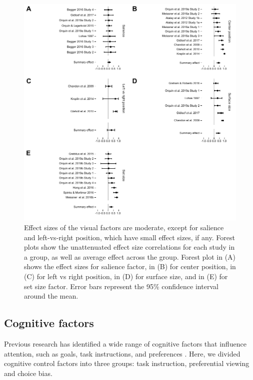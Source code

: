 \documentclass[english,natbib,man,floatsintext]{apa6}
\begin{document}
\begin{figure}[!h]
\includegraphics{forest_plots_visual}
\centering
\caption{Effect sizes of the visual factors are moderate, except for salience and left-vs-right position, which have small effect sizes, if any. Forest plots show the unattenuated effect size correlations for each study in a group, as well as average effect across the group. Forest plot in (A) shows the effect sizes for salience factor, in (B) for center position, in (C) for left vs right position, in  (D) for surface size, and in (E) for set size factor. Error bars represent the 95\% confidence interval around the mean.}
\label{fig:forest_plots_visual}
\end{figure}

\subsection{Cognitive factors}

Previous research has identified a wide range of cognitive factors that influence attention, such as goals, task instructions, and preferences \citep[for a review see][]{orquin2013a}. Here, we divided cognitive control factors into three groups: task instruction, preferential viewing and choice bias. 
\end{document}
